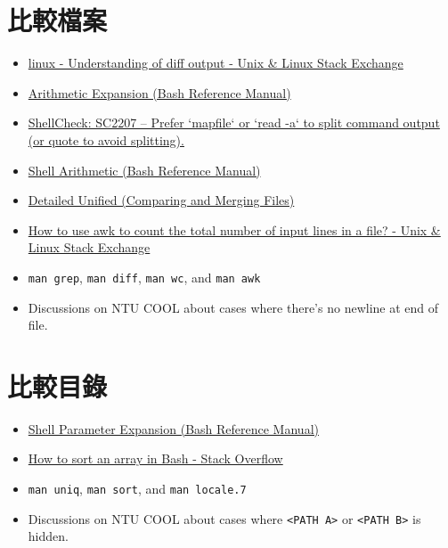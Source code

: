 \documentclass[12pt, a4paper]{article}
\begin{document}
  \section{比較檔案}
  \begin{itemize}
    \item \href{https://unix.stackexchange.com/questions/81998/understanding-of-diff-output}{linux - Understanding of diff output - Unix \& Linux Stack Exchange}
    \item \href{https://www.gnu.org/software/bash/manual/html_node/Arithmetic-Expansion.html}{Arithmetic Expansion (Bash Reference Manual)}
    \item \href{https://www.shellcheck.net/wiki/SC2207}{ShellCheck: SC2207 – Prefer `mapfile` or `read -a` to split command output (or quote to avoid splitting).}
    \item \href{https://www.gnu.org/software/bash/manual/html_node/Shell-Arithmetic.html}{Shell Arithmetic (Bash Reference Manual)}
    \item \href{https://www.gnu.org/software/diffutils/manual/html_node/Detailed-Unified.html}{Detailed Unified (Comparing and Merging Files)}
    \item \href{https://unix.stackexchange.com/questions/362278/how-to-use-awk-to-count-the-total-number-of-input-lines-in-a-file}{How to use awk to count the total number of input lines in a file? - Unix \& Linux Stack Exchange}
    \item \verb|man grep|, \verb|man diff|, \verb|man wc|, and \verb|man awk|
    \item Discussions on NTU COOL about cases where there's no newline at end of
      file.
  \end{itemize}

  \section{比較目錄}
  \begin{itemize}
    \item \href{https://www.gnu.org/software/bash/manual/html_node/Shell-Parameter-Expansion.html}{Shell Parameter Expansion (Bash Reference Manual)}
    \item \href{https://stackoverflow.com/questions/7442417/how-to-sort-an-array-in-bash}{How to sort an array in Bash - Stack Overflow}
    \item \verb|man uniq|, \verb|man sort|, and \verb|man locale.7|
    \item Discussions on NTU COOL about cases where \texttt{<PATH A>} or
      \texttt{<PATH B>} is hidden.
  \end{itemize}
\end{document}
